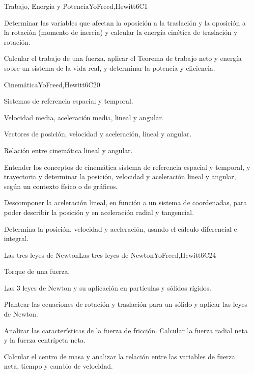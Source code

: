 \begin{syllabus}
\begin{unit}{Trabajo, Energía y Potencia}{}{YoFreed,Hewitt}{6}{C1}
   \begin{learningoutcomes}
      \item Determinar las variables que afectan la oposición a la traslación y la oposición a la rotación (momento de inercia) y calcular la energía cinética de traslación y rotación.
      \item Calcular el trabajo de una fuerza, aplicar el Teorema de trabajo neto y energía sobre un sistema de la vida real, y determinar la potencia y eficiencia.
   \end{learningoutcomes}
\end{unit}

\begin{unit}{}{Cinemática}{YoFreed,Hewitt}{6}{C20}
\begin{topics}
      \item Sistemas de referencia espacial y temporal.
      \item Velocidad media, aceleración media, lineal y angular.
      \item Vectores de posición, velocidad y aceleración, lineal y angular.
      \item Relación entre cinemática lineal y angular.
    \end{topics}
   \begin{learningoutcomes}
      \item Entender los conceptos de cinemática sistema de referencia espacial y temporal, y trayectoria y determinar la posición, velocidad y aceleración lineal y angular, según un contexto físico o de gráficos.
      \item Descomponer la aceleración lineal, en función a un sistema de coordenadas, para poder describir la posición y en aceleración radial y tangencial.
      \item Determina la posición, velocidad y aceleración, usando el cálculo diferencial e integral. 
   \end{learningoutcomes}
\end{unit}

\begin{unit}{Las tres leyes de Newton}{Las tres leyes de Newton}{YoFreed,Hewitt}{6}{C24}
\begin{topics}
      \item Torque de una fuerza.
      \item Las 3 leyes de Newton y su aplicación en partículas y sólidos rígidos.
   \end{topics}

   \begin{learningoutcomes}
      \item Plantear las ecuaciones de rotación y traslación para un sólido y aplicar las leyes de Newton. 
      \item Analizar las características de la fuerza de fricción. Calcular la fuerza radial neta y la fuerza centrípeta neta.
      \item Calcular el centro de masa y analizar la relación entre las variables de fuerza neta, tiempo y cambio de velocidad. 
   \end{learningoutcomes}
\end{unit}


\end{syllabus}
